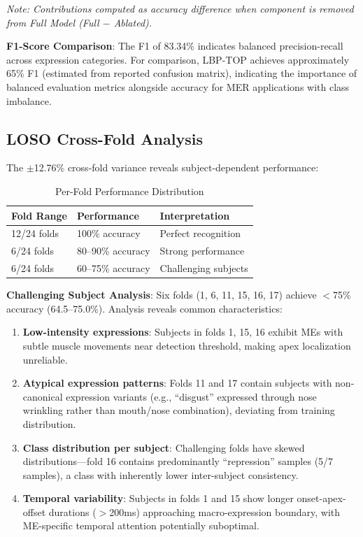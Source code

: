 \documentclass[preprint,12pt,authoryear]{elsarticle}
\begin{document}
\textit{Note: Contributions computed as accuracy difference when component is removed from Full Model (Full $-$ Ablated).}

\textbf{F1-Score Comparison}: The F1 of 83.34\% indicates balanced precision-recall across expression categories. For comparison, LBP-TOP achieves approximately 65\% F1 (estimated from reported confusion matrix), indicating the importance of balanced evaluation metrics alongside accuracy for MER applications with class imbalance.

\subsection{LOSO Cross-Fold Analysis}

The $\pm$12.76\% cross-fold variance reveals subject-dependent performance:

\begin{table}[htbp]
\centering
\caption{Per-Fold Performance Distribution}
\begin{tabular}{lll}
\toprule
\textbf{Fold Range} & \textbf{Performance} & \textbf{Interpretation} \\
\midrule
12/24 folds & 100\% accuracy & Perfect recognition \\
6/24 folds & 80--90\% accuracy & Strong performance \\
6/24 folds & 60--75\% accuracy & Challenging subjects \\
\bottomrule
\end{tabular}
\end{table}

\textbf{Challenging Subject Analysis}: Six folds (1, 6, 11, 15, 16, 17) achieve $<$75\% accuracy (64.5--75.0\%). Analysis reveals common characteristics:

\begin{enumerate}
\item \textbf{Low-intensity expressions}: Subjects in folds 1, 15, 16 exhibit MEs with subtle muscle movements near detection threshold, making apex localization unreliable.

\item \textbf{Atypical expression patterns}: Folds 11 and 17 contain subjects with non-canonical expression variants (e.g., ``disgust'' expressed through nose wrinkling rather than mouth/nose combination), deviating from training distribution.

\item \textbf{Class distribution per subject}: Challenging folds have skewed distributions---fold 16 contains predominantly ``repression'' samples (5/7 samples), a class with inherently lower inter-subject consistency.

\item \textbf{Temporal variability}: Subjects in folds 1 and 15 show longer onset-apex-offset durations ($>$200ms) approaching macro-expression boundary, with ME-specific temporal attention potentially suboptimal.
\end{enumerate}
\end{document}
